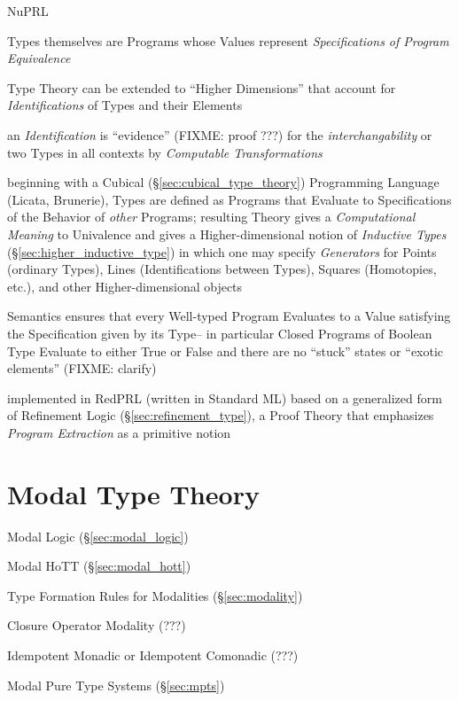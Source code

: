 NuPRL

Types themselves are Programs whose Values represent \emph{Specifications of
  Program Equivalence}

Type Theory can be extended to ``Higher Dimensions'' that account for
\emph{Identifications} of Types and their Elements

an \emph{Identification} is ``evidence'' (FIXME: proof ???) for the
\emph{interchangability} or two Types in all contexts by \emph{Computable
  Transformations}

beginning with a Cubical (\S\ref{sec:cubical_type_theory}) Programming Language
(Licata, Brunerie), Types are defined as Programs that Evaluate to
Specifications of the Behavior of \emph{other} Programs; resulting Theory gives
a \emph{Computational Meaning} to Univalence and gives a Higher-dimensional
notion of \emph{Inductive Types} (\S\ref{sec:higher_inductive_type}) in which
one may specify \emph{Generators} for Points (ordinary Types), Lines
(Identifications between Types), Squares (Homotopies, etc.), and other
Higher-dimensional objects

Semantics ensures that every Well-typed Program Evaluates to a Value satisfying
the Specification given by its Type-- in particular Closed Programs of Boolean
Type Evaluate to either True or False and there are no ``stuck'' states or
``exotic elements'' (FIXME: clarify)

implemented in RedPRL (written in Standard ML) based on a generalized form of
Refinement Logic (\S\ref{sec:refinement_type}), a Proof Theory that emphasizes
\emph{Program Extraction} as a primitive notion




\section{Modal Type Theory}\label{sec:modal_type_theory}

Modal Logic (\S\ref{sec:modal_logic})

Modal HoTT (\S\ref{sec:modal_hott})

Type Formation Rules for Modalities (\S\ref{sec:modality})

Closure Operator Modality (???)

Idempotent Monadic or Idempotent Comonadic (???)

Modal Pure Type Systems (\S\ref{sec:mpts})



